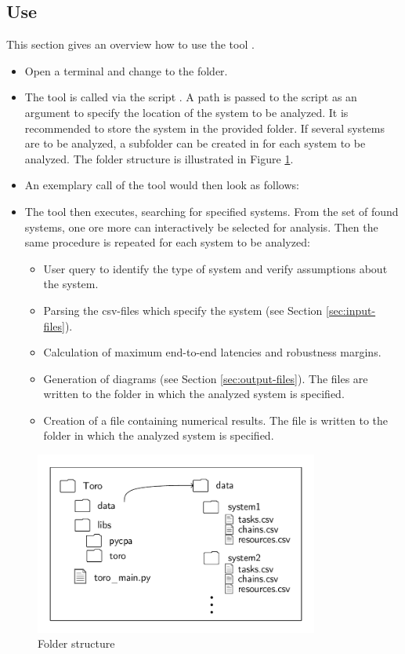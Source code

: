 \subsection{Use}
This section gives an overview how to use the tool \Tool.
\begin{itemize}
\item Open a terminal and change to the  folder.	
\item The tool \Tool is called via the script .
A path is passed to the script as an argument to specify the location of the system to be analyzed.
It is recommended to store the system in the provided  folder.
If several systems are to be analyzed, a subfolder can be created in  for each system to be analyzed. 
The folder structure is illustrated in Figure \ref{fig:structure}.
\item An exemplary call of the tool would then look as follows:
\begin{tcolorbox}
\end{tcolorbox}
%
\item The tool \Tool then executes, searching for specified systems. 
From the set of found systems, one ore more can interactively be selected for analysis.
Then the same procedure is repeated for each system to be analyzed:
\begin{itemize}
	\item User query to identify the type of system and verify assumptions about the system.
	\item Parsing the csv-files which specify the system (see Section \ref{sec:input-files}).
	\item Calculation of maximum end-to-end latencies and robustness margins.
	\item Generation of diagrams (see Section \ref{sec:output-files}). The files are written to the folder in which the analyzed system is specified.
	\item Creation of a file containing numerical results.  
	The file is written to the folder in which the analyzed system is specified.
\end{itemize}
\end{itemize}
%
\begin{figure}[t]
		\centering
				\includegraphics[trim=0.5cm 0.5cm 0.5cm 0.5cm, height=6cm]{fig/structure.pdf}
		\caption{Folder structure}
		\label{fig:structure}
\end{figure}
%


